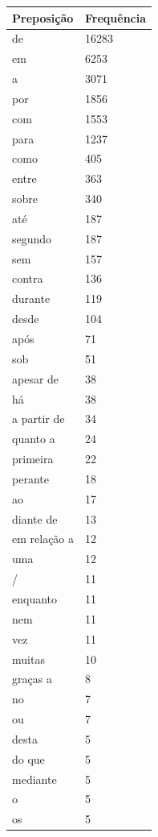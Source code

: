 \documentclass[output=paper,colorlinks,citecolor=brown]{langscibook}
\begin{document}
	\begin{longtable}{ | p{3cm} | p{2cm} | }
		\hline
		\textbf{Preposição} & \textbf{Frequência} \\\hline
		de & 16283\\\hline
		em & 6253\\\hline
		a & 3071\\\hline
		por & 1856\\\hline
		com & 1553\\\hline
		para & 1237\\\hline
		como & 405\\\hline
		entre & 363\\\hline
		sobre & 340\\\hline
		até & 187\\\hline
		segundo & 187\\\hline
		sem & 157\\\hline
		contra & 136\\\hline
		durante & 119\\\hline
		desde & 104\\\hline
		após & 71\\\hline
		sob & 51\\\hline
		apesar de & 38\\\hline
		há & 38\\\hline
		a partir de & 34\\\hline
		quanto a & 24\\\hline
		primeira & 22\\\hline
		perante & 18\\\hline
		ao & 17\\\hline
		diante de & 13\\\hline
		em relação a & 12\\\hline
		uma & 12\\\hline
		/ & 11\\\hline
		enquanto & 11\\\hline
		nem & 11\\\hline
		vez & 11\\\hline
		muitas & 10\\\hline
		graças a & 8\\\hline
		no & 7\\\hline
		ou & 7\\\hline
		desta & 5\\\hline
		do que & 5\\\hline
		mediante & 5\\\hline
		o & 5\\\hline
		os & 5\\\hline

\end{longtable}
\end{document}
